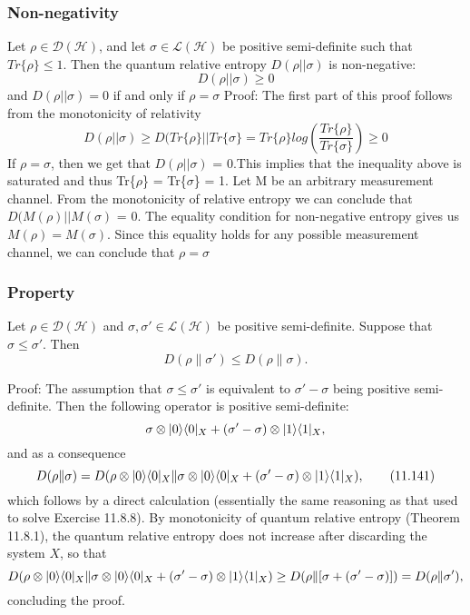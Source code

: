 \subsubsection{Non-negativity}
Let $\rho \in \mathcal{D}(\mathcal{H})$, and let $\sigma \in \mathcal{L}(\mathcal{H})$ be positive semi-definite such that $Tr\{\rho\} \leq 1$. Then the quantum relative entropy $D(\rho||\sigma)$ is non-negative:
\[
D(\rho||\sigma) \geq 0
\]
and $D(\rho||\sigma) = 0$ if and only if $\rho = \sigma$
\newline
\newline
Proof:
The first part of this proof follows from the monotonicity of relativity
\[
D(\rho||\sigma) \geq D(Tr\{\rho\}||Tr\{\sigma\} = Tr\{\rho\}log\left(\frac{Tr\{\rho\}}{Tr\{\sigma\}}\right) \geq 0
\]
If $\rho = \sigma$, then we get that $D(\rho||\sigma)$ = 0.This implies that the inequality above is saturated and thus Tr\{$\rho$\} = Tr\{$\sigma$\} = 1. Let M be an arbitrary measurement channel. From the monotonicity of relative entropy we can conclude that $D(M(\rho)||M(\sigma)$ = 0. The equality condition for non-negative entropy gives us $M(\rho) = M(\sigma)$. Since this equality holds for any possible measurement channel, we can conclude that $\rho = \sigma$
\newline

\subsubsection{Property}
Let $\rho \in \mathcal{D}(\mathcal{H})$ and $\sigma, \sigma' \in \mathcal{L}(\mathcal{H})$ be positive semi-definite. Suppose that $\sigma \leq \sigma'$. Then
\[
D(\rho \| \sigma') \leq D(\rho \| \sigma).
\]


Proof:
The assumption that $\sigma \leq \sigma'$ is equivalent to $\sigma' - \sigma$ being positive semi-definite. Then the following operator is positive semi-definite: 
\[
\sigma \otimes \lvert0\rangle\langle0\rvert_X + (\sigma' - \sigma) \otimes \lvert1\rangle\langle1\rvert_X,
\]
and as a consequence
\[
D(\rho \| \sigma) = D(\rho \otimes \lvert0\rangle\langle0\rvert_X \| \sigma \otimes \lvert0\rangle\langle0\rvert_X + (\sigma' - \sigma) \otimes \lvert1\rangle\langle1\rvert_X), \tag{11.141}
\]
which follows by a direct calculation (essentially the same reasoning as that used to solve Exercise 11.8.8). By monotonicity of quantum relative entropy (Theorem 11.8.1), the quantum relative entropy does not increase after discarding the system $X$, so that
\[
D(\rho \otimes \lvert0\rangle\langle0\rvert_X \| \sigma \otimes \lvert0\rangle\langle0\rvert_X + (\sigma' - \sigma) \otimes \lvert1\rangle\langle1\rvert_X)
\geq D(\rho \| [\sigma + (\sigma' - \sigma)]) = D(\rho \| \sigma'),
\]
concluding the proof.
